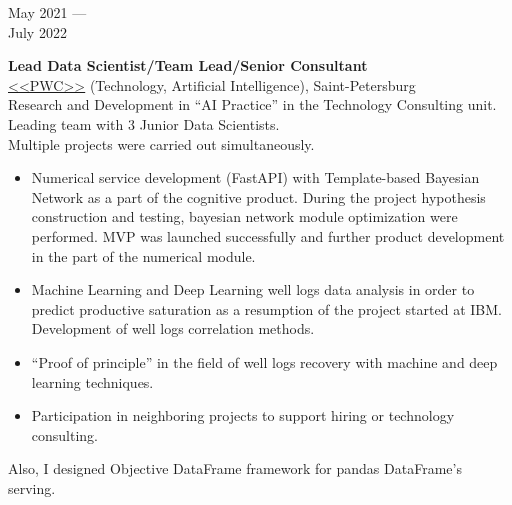 \documentclass[10pt,a4paper]{article}
\newcommand{\lmpratio}{0.15}
\newcommand{\rmpratio}{0.74}
\newcommand{\vSpace}{0.5cm}
\newcommand{\horizontalSpace}{0.05\textwidth}
\newcommand{\sectionMain}[1]{\textbf{#1}}
\begin{document}
	\begin{minipage}[t]{\lmpratio\textwidth}
		May 2021 --- \\July 2022
	\end{minipage}
	\hspace{\horizontalSpace}
	\begin{minipage}[t]{\rmpratio\textwidth}
		\sectionMain{Lead Data Scientist/Team Lead/Senior Consultant}\\
		\href{https://www.pwc.ru/}{<<PWC>>} (Technology, Artificial Intelligence), Saint-Petersburg\\[0.3cm]		
		
		Research and Development in ``AI Practice'' in the Technology Consulting unit.\\
		Leading team with 3 Junior Data Scientists.\\
		
		Multiple projects were carried out simultaneously.
		
		\begin{itemize}
			\item Numerical service development (FastAPI) with Template-based Bayesian Network as a part of the cognitive product. 
			During the project hypothesis construction and testing, bayesian network module optimization were performed. 
			MVP was launched successfully and further product development in the part of the numerical module.
			\item Machine Learning and Deep Learning well logs data analysis in order to predict productive saturation as a resumption of the project started at IBM.
			Development of well logs correlation methods.
			\item ``Proof of principle'' in the field of well logs recovery with machine and deep learning techniques.
			\item Participation in neighboring projects to support hiring or technology consulting.
			
		\end{itemize}
		
		Also, I designed Objective DataFrame framework for pandas DataFrame's serving.
		
		
		
	\end{minipage}	
	\vspace{\vSpace}
	
\end{document}
